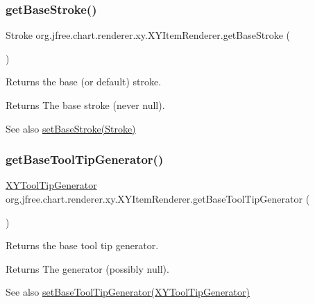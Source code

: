 \subsubsection{\texorpdfstring{get\+Base\+Stroke()}{getBaseStroke()}}
{\footnotesize\ttfamily Stroke org.\+jfree.\+chart.\+renderer.\+xy.\+X\+Y\+Item\+Renderer.\+get\+Base\+Stroke (\begin{DoxyParamCaption}{ }\end{DoxyParamCaption})}

Returns the base (or default) stroke.

\begin{DoxyReturn}{Returns}
The base stroke (never {\ttfamily null}).
\end{DoxyReturn}
\begin{DoxySeeAlso}{See also}
\mbox{\hyperlink{interfaceorg_1_1jfree_1_1chart_1_1renderer_1_1xy_1_1_x_y_item_renderer_ab49f6dd93d5b994aea58be71e1f8c9b9}{set\+Base\+Stroke(\+Stroke)}} 
\end{DoxySeeAlso}
\mbox{\label{interfaceorg_1_1jfree_1_1chart_1_1renderer_1_1xy_1_1_x_y_item_renderer_ad56671cc8a9a90acdf7eae3339a0d068}} 
\subsubsection{\texorpdfstring{get\+Base\+Tool\+Tip\+Generator()}{getBaseToolTipGenerator()}}
{\footnotesize\ttfamily \mbox{\hyperlink{interfaceorg_1_1jfree_1_1chart_1_1labels_1_1_x_y_tool_tip_generator}{X\+Y\+Tool\+Tip\+Generator}} org.\+jfree.\+chart.\+renderer.\+xy.\+X\+Y\+Item\+Renderer.\+get\+Base\+Tool\+Tip\+Generator (\begin{DoxyParamCaption}{ }\end{DoxyParamCaption})}

Returns the base tool tip generator.

\begin{DoxyReturn}{Returns}
The generator (possibly {\ttfamily null}).
\end{DoxyReturn}
\begin{DoxySeeAlso}{See also}
\mbox{\hyperlink{interfaceorg_1_1jfree_1_1chart_1_1renderer_1_1xy_1_1_x_y_item_renderer_ae53df47412e048dfb68cf0cdf578c394}{set\+Base\+Tool\+Tip\+Generator(\+X\+Y\+Tool\+Tip\+Generator)}} 
\end{DoxySeeAlso}


